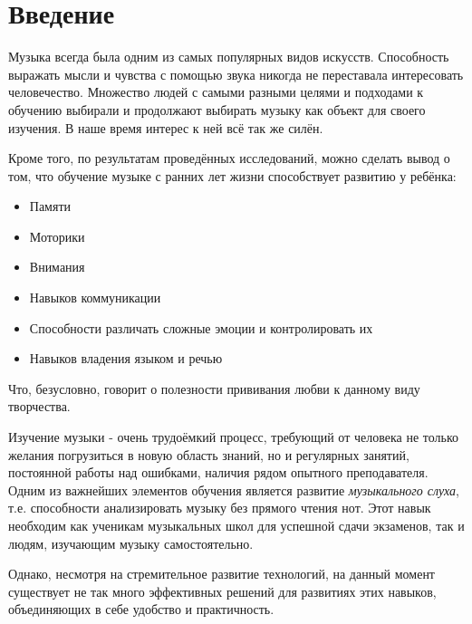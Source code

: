 \chapter{Введение}
\setlength\parindent{1.5em} 
\par 
Музыка всегда была одним из самых популярных видов искусств. Способность выражать мысли и чувства с помощью звука никогда не переставала интересовать человечество. Множество людей с самыми разными целями и подходами к обучению выбирали и продолжают выбирать музыку как объект для своего изучения. В наше время интерес к ней всё так же силён\cite{thamprasert2023network}.

Кроме того, по результатам проведённых исследований\cite{dumont2017music}, можно сделать вывод о том, что обучение музыке с ранних лет жизни способствует развитию у ребёнка:
\begin{itemize}
\item Памяти
\item Моторики
\item Внимания
\item Навыков коммуникации
\item Способности различать сложные эмоции и контролировать их
\item Навыков владения языком и речью
\end{itemize}\par
Что, безусловно, говорит о полезности прививания любви к данному виду творчества.\par

Изучение музыки - очень трудоёмкий процесс, требующий от человека не только желания погрузиться в новую область знаний, но и регулярных занятий, постоянной работы над ошибками, наличия рядом опытного преподавателя. Одним из важнейших элементов обучения является развитие \textit{музыкального слуха}, т.е. способности анализировать музыку без прямого чтения нот. Этот навык необходим как ученикам музыкальных школ для успешной сдачи экзаменов, так и людям, изучающим музыку самостоятельно.\par

Однако, несмотря на стремительное развитие технологий, на данный момент существует не так много эффективных решений для развитиях этих навыков, объединяющих в себе удобство и практичность.